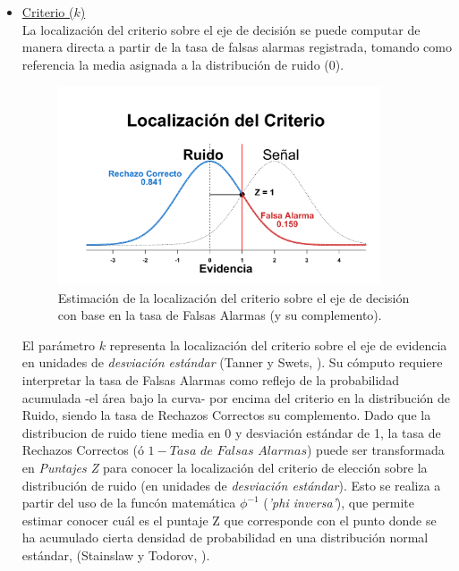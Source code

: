 \begin{itemize}
\item \underline{Criterio ($k$)}\\

La localización del criterio sobre el eje de decisión se puede computar de manera directa a partir de la tasa de falsas alarmas registrada, tomando como referencia la media asignada a la distribución de ruido ($0$). \\

\begin{figure}[th]
\centering
\includegraphics[width=0.90\textwidth]{Figures/Graficador_CriterioR} 
\caption[Estimación del criterio con base en las Falsas Alarmas]{Estimación de la localización del criterio sobre el eje de decisión con base en la tasa de Falsas Alarmas (y su complemento).}
\label{fig:Graf_Criterio}
\end{figure}

El parámetro $k$ representa la localización del criterio sobre el eje de evidencia en unidades de \textit{desviación estándar} (Tanner y Swets, \citeyear{Tanner1954}). Su cómputo requiere interpretar la tasa de Falsas Alarmas como reflejo de la probabilidad acumulada -el área bajo la curva- por encima del criterio en la distribución de Ruido, siendo la tasa de Rechazos Correctos su complemento. Dado que la distribucion de ruido tiene media en 0 y desviación estándar de 1, la tasa de Rechazos Correctos (ó $1 - Tasa$ $de$ $Falsas$ $Alarmas$) puede ser transformada en \textit{Puntajes Z} para conocer la localización del criterio de elección sobre la distribución de ruido (en unidades de \textit{desviación estándar}). Esto se realiza a partir del uso de la funcón matemática $\phi^{-1}$ (\textit{'phi inversa'}), que permite estimar conocer cuál es el puntaje Z que corresponde con el punto donde se ha acumulado cierta densidad de probabilidad en una distribución normal estándar, (Stainslaw y Todorov, \citeyear{Stainslaw1999}).\\


\end{itemize}
